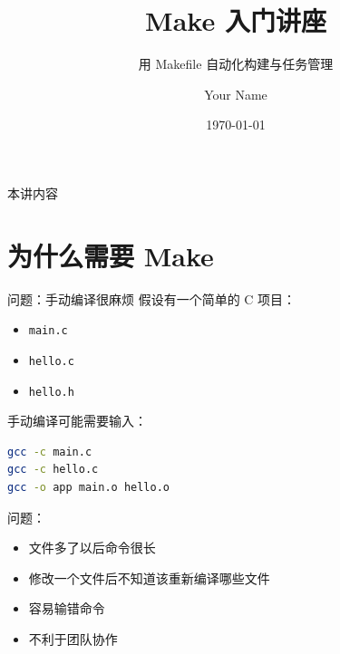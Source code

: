 \documentclass[aspectratio=169]{ctexbeamer}
\title{Make 入门讲座}
\subtitle{用 Makefile 自动化构建与任务管理}
\author{Your Name}
\date{\today}
\begin{document}
\begin{frame}
  \titlepage
\end{frame}

\begin{frame}{本讲内容}
  \tableofcontents
\end{frame}

\section{为什么需要 Make}

\begin{frame}[fragile]{问题：手动编译很麻烦}
假设有一个简单的 C 项目：

\begin{itemize}
  \item \texttt{main.c}
  \item \texttt{hello.c}
  \item \texttt{hello.h}
\end{itemize}

手动编译可能需要输入：

\begin{lstlisting}[language=bash]
gcc -c main.c
gcc -c hello.c
gcc -o app main.o hello.o
\end{lstlisting}

问题：

\begin{itemize}
  \item 文件多了以后命令很长
  \item 修改一个文件后不知道该重新编译哪些文件
  \item 容易输错命令
  \item 不利于团队协作
\end{itemize}
\end{frame}
\end{document}

